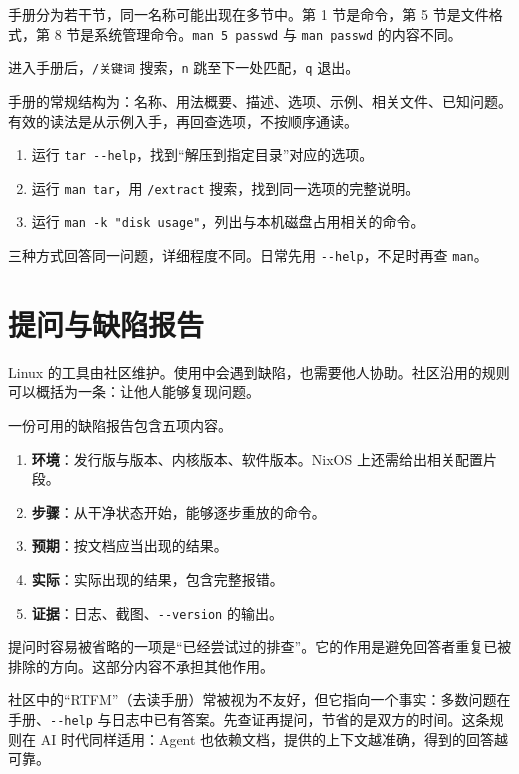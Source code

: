 手册分为若干节，同一名称可能出现在多节中。第 1 节是命令，第 5 节是文件格式，第 8 节是系统管理命令。\texttt{man 5 passwd} 与 \texttt{man passwd} 的内容不同。

进入手册后，\texttt{/关键词} 搜索，\texttt{n} 跳至下一处匹配，\texttt{q} 退出。

手册的常规结构为：名称、用法概要、描述、选项、示例、相关文件、已知问题。有效的读法是从示例入手，再回查选项，不按顺序通读。

\begin{lab}[练习：用三种方式查同一件事]
\begin{enumerate}
  \item 运行 \texttt{tar -{}-help}，找到“解压到指定目录”对应的选项。
  \item 运行 \texttt{man tar}，用 \texttt{/extract} 搜索，找到同一选项的完整说明。
  \item 运行 \texttt{man -\allowbreak{}k "disk usage"}，列出与本机磁盘占用相关的命令。
\end{enumerate}
三种方式回答同一问题，详细程度不同。日常先用 \texttt{-{}-help}，不足时再查 \texttt{man}。
\end{lab}

\section{提问与缺陷报告}

Linux 的工具由社区维护。使用中会遇到缺陷，也需要他人协助。社区沿用的规则可以概括为一条：让他人能够复现问题。

一份可用的缺陷报告包含五项内容。

\begin{enumerate}
  \item \textbf{环境}：发行版与版本、内核版本、软件版本。NixOS 上还需给出相关配置片段。
  \item \textbf{步骤}：从干净状态开始，能够逐步重放的命令。
  \item \textbf{预期}：按文档应当出现的结果。
  \item \textbf{实际}：实际出现的结果，包含完整报错。
  \item \textbf{证据}：日志、截图、\texttt{-{}-version} 的输出。
\end{enumerate}

提问时容易被省略的一项是“已经尝试过的排查”。它的作用是避免回答者重复已被排除的方向。这部分内容不承担其他作用。

\begin{culturenote}
社区中的“RTFM”（去读手册）常被视为不友好，但它指向一个事实：多数问题在手册、\texttt{-{}-help} 与日志中已有答案。先查证再提问，节省的是双方的时间。这条规则在 AI 时代同样适用：Agent 也依赖文档，提供的上下文越准确，得到的回答越可靠。
\end{culturenote}


